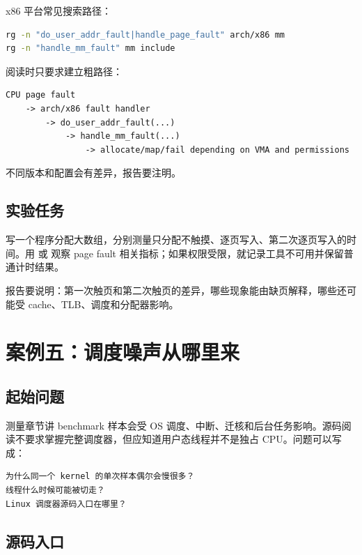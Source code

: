 x86 平台常见搜索路径：

\begin{lstlisting}[language=bash]
rg -n "do_user_addr_fault|handle_page_fault" arch/x86 mm
rg -n "handle_mm_fault" mm include
\end{lstlisting}

阅读时只要求建立粗路径：

\begin{lstlisting}
CPU page fault
    -> arch/x86 fault handler
        -> do_user_addr_fault(...)
            -> handle_mm_fault(...)
                -> allocate/map/fail depending on VMA and permissions
\end{lstlisting}

不同版本和配置会有差异，报告要注明。

\subsection{实验任务}

\begin{labbox}
写一个程序分配大数组，分别测量只分配不触摸、逐页写入、第二次逐页写入的时间。用  或  观察 page fault 相关指标；如果权限受限，就记录工具不可用并保留普通计时结果。

报告要说明：第一次触页和第二次触页的差异，哪些现象能由缺页解释，哪些还可能受 cache、TLB、调度和分配器影响。
\end{labbox}

\section{案例五：调度噪声从哪里来}

\subsection{起始问题}

测量章节讲 benchmark 样本会受 OS 调度、中断、迁核和后台任务影响。源码阅读不要求掌握完整调度器，但应知道用户态线程并不是独占 CPU。问题可以写成：

\begin{lstlisting}
为什么同一个 kernel 的单次样本偶尔会慢很多？
线程什么时候可能被切走？
Linux 调度器源码入口在哪里？
\end{lstlisting}

\subsection{源码入口}

